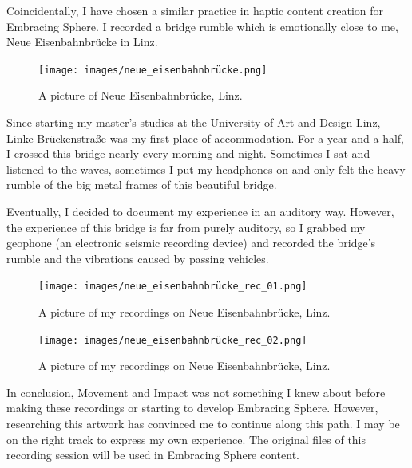                 Coincidentally, I have chosen a similar practice in haptic content creation for Embracing Sphere. I recorded a bridge rumble which is emotionally close to me, Neue Eisenbahnbrücke in Linz.\par

                \begin{figure}[H]
                    \centering
                    \texttt{[image: images/neue\_eisenbahnbrücke.png]}
                    \caption{A picture of Neue Eisenbahnbrücke, Linz.}
                    \label{fig:BRUCKELINZ}
                \end{figure}

                Since starting my master's studies at the University of Art and Design Linz, Linke Brückenstraße was my first place of accommodation. For a year and a half, I crossed this bridge nearly every morning and night. Sometimes I sat and listened to the waves, sometimes I put my headphones on and only felt the heavy rumble of the big metal frames of this beautiful bridge.\par

                Eventually, I decided to document my experience in an auditory way. However, the experience of this bridge is far from purely auditory, so I grabbed my geophone (an electronic seismic recording device) and recorded the bridge’s rumble and the vibrations caused by passing vehicles.\par

                \begin{figure}[H]
                    \centering
                    \texttt{[image: images/neue\_eisenbahnbrücke\_rec\_01.png]}
                    \caption{A picture of my recordings on Neue Eisenbahnbrücke, Linz.}
                    \label{fig:BRUCKELINZREC_01}
                \end{figure}

                \begin{figure}[H]
                    \centering
                    \texttt{[image: images/neue\_eisenbahnbrücke\_rec\_02.png]}
                    \caption{A picture of my recordings on Neue Eisenbahnbrücke, Linz.}
                    \label{fig:BRUCKELINZREC_02}
                \end{figure}

                In conclusion, Movement and Impact was not something I knew about before making these recordings or starting to develop Embracing Sphere. However, researching this artwork has convinced me to continue along this path. I may be on the right track to express my own experience. The original files of this recording session will be used in Embracing Sphere content.\par
